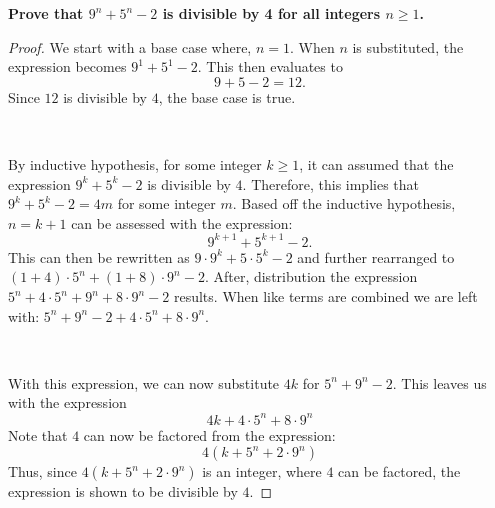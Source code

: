 \textbf{Prove that \(9^n + 5^n - 2\) is divisible by 4 for all integers \(n \geq 1\).}
   \begin{proof}
       We start with a base case where, \(n = 1\). When \(n\) is substituted, the expression becomes \(9^1 + 5^1 - 2\). This then evaluates to \[9 + 5 - 2 = 12.\] Since \(12\) is divisible by \(4\), the base case is true.

       ~

       \noindent By inductive hypothesis, for some integer \(k \ge 1\), it can assumed that the expression \(9^{k} + 5^{k} - 2\) is divisible by \(4\). Therefore, this implies that \(9^{k}+5^{k}-2=4m\) for some integer \(m\). Based off the inductive hypothesis, \(n = k + 1\) can be assessed with the expression:
       \[9^{k+1} + 5^{k+1} - 2.\]
       This can then be rewritten as \(9\cdot 9^{k} + 5\cdot 5^{k} - 2\) and further rearranged to \((1+4)\cdot5^n+(1+8)\cdot9^n-2\). After, distribution the expression \(5^n+4\cdot5^n+9^n+8\cdot9^n-2\) results.
       When like terms are combined we are left with:
       \(5^n+9^n-2+4\cdot5^n+8\cdot9^n.\)

       ~

       \noindent With this expression, we can now substitute \(4k\) for \(5^n+9^n-2\). This leaves us with the expression \[4k+4\cdot5^n+8\cdot9^n\] Note that \(4\) can now be factored from the expression: \[4(k+5^n+2\cdot9^n)\]
   Thus, since \(4(k+5^n+2\cdot9^n)\) is an integer, where \(4\) can be factored, the expression is shown to be divisible by \(4\).
   \end{proof}
